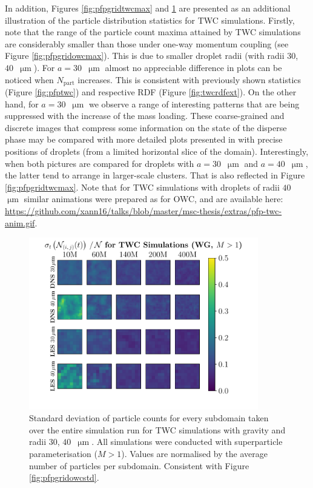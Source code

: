 \documentclass{pracamgren}
\begin{document}
\medskip

In addition, Figures \ref{fig:pfpgridtwcmax} and \ref{fig:pfpgridrdfstd} are presented as an additional illustration of the particle distribution statistics for TWC simulations.
Firstly, note that the range of the particle count maxima attained by TWC simulations are considerably smaller than those under one-way momentum coupling (see Figure \ref{fig:pfpgridowcmax}).
This is due to smaller droplet radii (with radii $30$,~$40$~$\upmu\text{m}$).
For $a = 30$~$\upmu\text{m}$ almost no appreciable difference in plots can be noticed when $N_{\text{part}}$ increases.
This is consistent with previously shown statistics (Figure \ref{fig:pfptwc}) and respective RDF (Figure \ref{fig:twcrdfext}).
On the other hand, for $a = 30$~$\upmu\text{m}$ we observe a range of interesting patterns that are being suppressed with the increase of the mass loading.
These coarse-grained and discrete images that compress some information on the state of the disperse phase may be compared with more detailed plots presented in \textcite[Figure 9bc]{Rosa2020} with precise positions of droplets (from a limited horizontal slice of the domain).
Interestingly, when both pictures are compared for droplets with $a = 30$~$\upmu\text{m}$ and $a = 40$~$\upmu\text{m}$, the latter tend to arrange in larger-scale clusters.
That is also reflected in Figure \ref{fig:pfpgridtwcmax}.
Note that for TWC simulations with droplets of radii $40$~$\upmu\text{m}$ similar animations were prepared as for OWC, and are available here: \url{https://github.com/xann16/talks/blob/master/msc-thesis/extras/pfp-twc-anim.gif}.

\begin{figure}[h]
\centering
\includegraphics[width=10cm]{img/plots/3-4j-pfpgridrdfstd.pdf}
\caption{
Standard deviation of particle counts for every subdomain taken over the entire simulation run for TWC simulations with gravity and radii $30$, $40$~$\upmu\text{m}$.
All simulations were conducted with superparticle parameterisation ($M>1$). 
Values are normalised by the average number of particles per subdomain.
Consistent with Figure \ref{fig:pfpgridowcstd}.
}
\label{fig:pfpgridrdfstd}
\end{figure}
\end{document}
